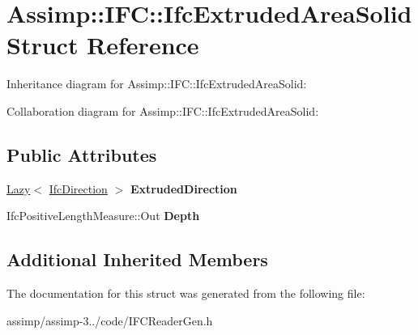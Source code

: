 \hypertarget{struct_assimp_1_1_i_f_c_1_1_ifc_extruded_area_solid}{\section{Assimp\+:\+:I\+F\+C\+:\+:Ifc\+Extruded\+Area\+Solid Struct Reference}
\label{struct_assimp_1_1_i_f_c_1_1_ifc_extruded_area_solid}
}


Inheritance diagram for Assimp\+:\+:I\+F\+C\+:\+:Ifc\+Extruded\+Area\+Solid\+:


Collaboration diagram for Assimp\+:\+:I\+F\+C\+:\+:Ifc\+Extruded\+Area\+Solid\+:
\subsection*{Public Attributes}
\begin{DoxyCompactItemize}
\item 
\hypertarget{struct_assimp_1_1_i_f_c_1_1_ifc_extruded_area_solid_ab294b4c94497412bfff0c381b8922cee}{\hyperlink{struct_assimp_1_1_s_t_e_p_1_1_lazy}{Lazy}$<$ \hyperlink{struct_assimp_1_1_i_f_c_1_1_ifc_direction}{Ifc\+Direction} $>$ {\bfseries Extruded\+Direction}}\label{struct_assimp_1_1_i_f_c_1_1_ifc_extruded_area_solid_ab294b4c94497412bfff0c381b8922cee}

\item 
\hypertarget{struct_assimp_1_1_i_f_c_1_1_ifc_extruded_area_solid_a425823730d65a71fc0871905634253f1}{Ifc\+Positive\+Length\+Measure\+::\+Out {\bfseries Depth}}\label{struct_assimp_1_1_i_f_c_1_1_ifc_extruded_area_solid_a425823730d65a71fc0871905634253f1}

\end{DoxyCompactItemize}
\subsection*{Additional Inherited Members}


The documentation for this struct was generated from the following file\+:\begin{DoxyCompactItemize}
\item 
assimp/assimp-\/3../code/I\+F\+C\+Reader\+Gen.\+h\end{DoxyCompactItemize}
